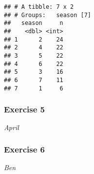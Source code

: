 \documentclass[
]{article}
\begin{document}
\begin{verbatim}
## # A tibble: 7 x 2
## # Groups:   season [7]
##   season     n
##    <dbl> <int>
## 1      2    24
## 2      4    22
## 3      5    22
## 4      6    22
## 5      3    16
## 6      7    11
## 7      1     6
\end{verbatim}

\subsubsection{Exercise 5}\label{exercise-5}

\emph{April}

\subsubsection{Exercise 6}\label{exercise-6}

\emph{Ben}
\end{document}
